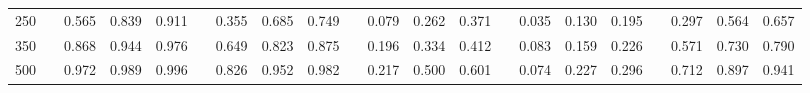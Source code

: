 % 
\begin{tabular}{ccccccccccccccccccccc}
  \hline
  \hline
250 &  & 0.565 & 0.839 & 0.911 &  & 0.355 & 0.685 & 0.749 &  & 0.079 & 0.262 & 0.371 &  & 0.035 & 0.130 & 0.195 &  & 0.297 & 0.564 & 0.657 \\ 
  350 &  & 0.868 & 0.944 & 0.976 &  & 0.649 & 0.823 & 0.875 &  & 0.196 & 0.334 & 0.412 &  & 0.083 & 0.159 & 0.226 &  & 0.571 & 0.730 & 0.790 \\ 
  500 &  & 0.972 & 0.989 & 0.996 &  & 0.826 & 0.952 & 0.982 &  & 0.217 & 0.500 & 0.601 &  & 0.074 & 0.227 & 0.296 &  & 0.712 & 0.897 & 0.941 \\ 
   \hline
\end{tabular}
